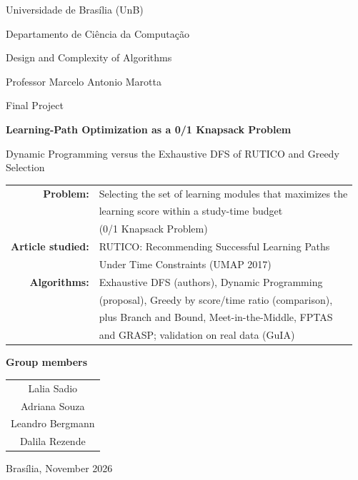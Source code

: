 \documentclass[11pt,a4paper]{article}
\theoremstyle{plain}
\theoremstyle{definition}
\theoremstyle{remark}
\renewcommand{\_}{\textunderscore\hspace{0pt}}  %
\begin{document}
\begin{titlepage}
\centering
{\large Universidade de Bras\'ilia (UnB)\par}
{\large Departamento de Ci\^encia da Computa\c{c}\~ao\par}
\vspace{0.6cm}
{\normalsize Design and Complexity of Algorithms\par}
{\normalsize Professor Marcelo Antonio Marotta\par}
{\normalsize Final Project\par}
\vspace{2.2cm}
{\LARGE\bfseries Learning-Path Optimization as a 0/1 Knapsack Problem\par}
\vspace{0.4cm}
{\Large Dynamic Programming versus the Exhaustive DFS of RUTICO and Greedy Selection\par}
\vspace{1.4cm}
\begin{tabular}{rl}
\textbf{Problem:} & Selecting the set of learning modules that maximizes the\\
& learning score within a study-time budget\\
& (0/1 Knapsack Problem)\\[4pt]
\textbf{Article studied:} & RUTICO: Recommending Successful Learning Paths\\
& Under Time Constraints (UMAP 2017)\\[4pt]
\textbf{Algorithms:} & Exhaustive DFS (authors), Dynamic Programming\\
& (proposal), Greedy by score/time ratio (comparison),\\
& plus Branch and Bound, Meet-in-the-Middle, FPTAS\\
& and GRASP; validation on real data (GuIA)\\
\end{tabular}
\vspace{1.6cm}

{\large\bfseries Group members\par}
\vspace{0.3cm}
\begin{tabular}{c}
Lalia Sadio\\
Adriana Souza\\
Leandro Bergmann\\
Dalila Rezende\\
\end{tabular}
\vfill
{\normalsize Bras\'ilia, November 2026\par}
\end{titlepage}
\end{document}
